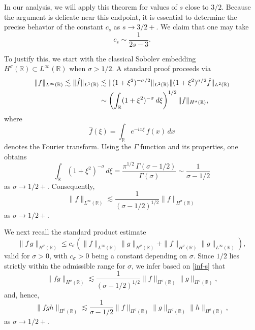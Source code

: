 \documentclass{amsart}
\newcommand{\R}{\mathbb R}
\begin{document}
In our analysis, we will apply this theorem for values of $s$ close to $3/2$. Because the argument is delicate near this endpoint, it is essential to determine the precise behavior of the constant $c_s$ as $s\to 3/2+$. We claim that one may take 
\begin{equation}
c_s\sim \frac{1}{2s-3}.
\label{cs}
\end{equation}

To justify this, we start with the classical Sobolev embedding $H^\sigma(\R)\subset L^\infty(\R)$ when $\sigma>1/2$. A standard proof proceeds via
\begin{equation*}
\aligned
\|f\|_{L^\infty(\R)}\lesssim \|\hat{f}\|_{L^1(\R)}&\lesssim \|(1+\xi^2)^{-\sigma/2}\|_{L^2(\R)} \|(1+\xi^2)^{\sigma/2}\hat{f}\|_{L^2(\R)}\\
&\sim \left(\int_\R(1+\xi^2)^{-\sigma}\,d\xi\right)^{1/2}\|f\|_{H^\sigma(\R)},
\endaligned
\end{equation*}
where
\[
\hat{f}(\xi)=\int_\R e^{-ix\xi}\,f(x)\,dx
\] 
denotes the Fourier transform. Using the $\Gamma$ function and its properties, one obtains
\begin{equation*}
\int_\R(1+\xi^2)^{-\sigma}\,d\xi= \frac{\pi^{1/2}\,\Gamma(\sigma-1/2)}{\Gamma(\sigma)}\sim \frac{1}{\sigma-1/2}
\end{equation*}
as $\sigma\to 1/2+$. Consequently,
\begin{equation}
\|f\|_{L^\infty(\R)}\lesssim \frac{1}{(\sigma-1/2)^{1/2}}\|f\|_{H^\sigma(\R)}
\label{inf-s}
\end{equation}
as $\sigma\to 1/2+$.

We next recall the standard product estimate
\begin{equation*}
\|f\,g\|_{H^\sigma(\R)}\leq c_\sigma\left(\|f\|_{L^\infty(\R)}\|g\|_{H^\sigma(\R)}+\|f\|_{H^\sigma(\R)}\|g\|_{L^\infty(\R)}\right),
\end{equation*}
valid for $\sigma>0$, with $c_\sigma>0$ being a constant depending on $\sigma$. Since $1/2$ lies strictly within the admissible range for $\sigma$, we infer based on \eqref{inf-s} that
\begin{equation*}
\|f g\|_{H^\sigma(\R)}\lesssim \frac{1}{(\sigma-1/2)^{1/2}}\|f\|_{H^\sigma(\R)}\|g\|_{H^\sigma(\R)},
\end{equation*}
and, hence,
\begin{equation*}
\|f g h\|_{H^\sigma(\R)}\lesssim \frac{1}{\sigma-1/2}\|f\|_{H^\sigma(\R)}\|g\|_{H^\sigma(\R)}\|h\|_{H^\sigma(\R)},
\end{equation*}
as $\sigma\to 1/2+$.
\end{document}
